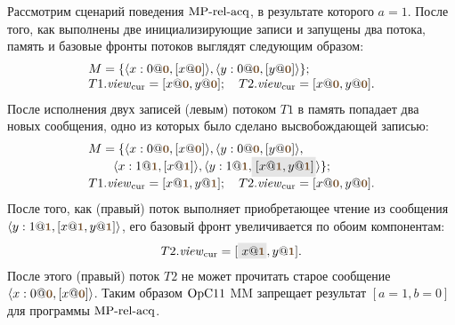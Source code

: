 Рассмотрим сценарий поведения ${\rm MP\text{-}rel\text{-}acq}$, в результате которого $a = 1$.
После того, как выполнены две инициализирующие записи и запущены два потока, память и базовые фронты потоков
выглядят следующим образом:
\[
\begin{array}{l}
M = \{\angled{x:0@\tstamp{0}, [x@\tstamp{0}]}, \angled{y:0@\tstamp{0},[y@\tstamp{0}]} \}; \\
T1.\Rcur = [x@\tstamp{0}, y@\tstamp{0}];
\quad T2.\Rcur = [x@\tstamp{0}, y@\tstamp{0}].
\end{array}
\]
После исполнения двух записей (левым) потоком $T1$ в память попадает два новых сообщения, одно из которых
было сделано высвобождающей записью:
\[
\begin{array}{l}
M = \{
\angled{x:0@\tstamp{0}, [x@\tstamp{0}]}, \angled{y:0@\tstamp{0},[y@\tstamp{0}]}, \\
\qquad \angled{x:1@\tstamp{1}, [x@\tstamp{1}]}, \angled{y:1@\tstamp{1},\graybox{[x@\tstamp{1},y@\tstamp{1}]}}
 \}; \\
T1.\Rcur = [x@\tstamp{1}, y@\tstamp{1}];
\quad T2.\Rcur = [x@\tstamp{0}, y@\tstamp{0}].
\end{array}
\]
После того, как (правый) поток выполняет приобретающее чтение из сообщения 
$\angled{y:1@\tstamp{1},[x@\tstamp{1},y@\tstamp{1}]}$, его базовый фронт увеличивается по обоим компонентам:
\[
\begin{array}{l}
T2.\Rcur = [\graybox{x@\tstamp{1}}, y@\tstamp{1}].
\end{array}
\]
После этого (правый) поток $T2$ не может прочитать старое сообщение $\angled{x:0@\tstamp{0}, [x@\tstamp{0}]}$.
Таким образом $\mathrm{OpC11}$ MM запрещает результат $[a = 1, b = 0]$ для программы ${\rm MP\text{-}rel\text{-}acq}$.

